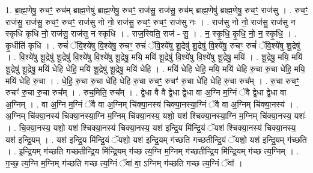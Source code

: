 \documentclass[17pt]{extarticle}
\begin{document}
1. ब्रा॒ह्म॒णेषु॒ रुचꣳ॒॒ रुच॑म् ब्राह्म॒णेषु॑ ब्राह्म॒णेषु॒ रुचꣳ॒॒ राज॑सु॒ राज॑सु॒ रुच॑म् ब्राह्म॒णेषु॑ ब्राह्म॒णेषु॒ रुचꣳ॒॒ राज॑सु । . रुचꣳ॒॒ राज॑सु॒ राज॑सु॒ रुचꣳ॒॒ रुचꣳ॒॒ राज॑सु नो नो॒ राज॑सु॒ रुचꣳ॒॒ रुचꣳ॒॒ राज॑सु नः । . राज॑सु नो नो॒ राज॑सु॒ राज॑सु न स्कृधि कृधि नो॒ राज॑सु॒ राज॑सु न स्कृधि । . राज॒स्विति॒ राज॑ - सु॒ । . न॒ स्कृ॒धि॒ कृ॒धि॒ नो॒ न॒ स्कृ॒धि॒ । . कृ॒धीति॑ कृधि । . रुचं॑ ॅवि॒श्ये॑षु वि॒श्ये॑षु॒ रुचꣳ॒॒ रुचं॑ ॅवि॒श्ये॑षु शू॒द्रेषु॑ शू॒द्रेषु॑ वि॒श्ये॑षु॒ रुचꣳ॒॒ रुचं॑ ॅवि॒श्ये॑षु शू॒द्रेषु॑ । . वि॒श्ये॑षु शू॒द्रेषु॑ शू॒द्रेषु॑ वि॒श्ये॑षु वि॒श्ये॑षु शू॒द्रेषु॒ मयि॒ मयि॑ शू॒द्रेषु॑ वि॒श्ये॑षु वि॒श्ये॑षु शू॒द्रेषु॒ मयि॑ । . शू॒द्रेषु॒ मयि॒ मयि॑ शू॒द्रेषु॑ शू॒द्रेषु॒ मयि॑ धेहि धेहि॒ मयि॑ शू॒द्रेषु॑ शू॒द्रेषु॒ मयि॑ धेहि । . मयि॑ धेहि धेहि॒ मयि॒ मयि॑ धेहि रु॒चा रु॒चा धे॑हि॒ मयि॒ मयि॑ धेहि रु॒चा । . धे॒हि॒ रु॒चा रु॒चा धे॑हि धेहि रु॒चा रुचꣳ॒॒ रुचꣳ॑ रु॒चा धे॑हि धेहि रु॒चा रुच᳚म् । . रु॒चा रुचꣳ॒॒ रुचꣳ॑ रु॒चा रु॒चा रुच᳚म् । . रुच॒मिति॒ रुच᳚म् । . द्वे॒धा वै वै द्वे॒धा द्वे॒धा वा अ॒ग्नि म॒ग्निं ॅवै द्वे॒धा द्वे॒धा वा अ॒ग्निम् । . वा अ॒ग्नि म॒ग्निं ॅवै वा अ॒ग्निम् चि॑क्या॒नस्य॑ चिक्या॒नस्या॒ग्निं ॅवै वा अ॒ग्निम् चि॑क्या॒नस्य॑ । . अ॒ग्निम् चि॑क्या॒नस्य॑ चिक्या॒नस्या॒ग्नि म॒ग्निम् चि॑क्या॒नस्य॒ यशो॒ यश॑ श्चिक्या॒नस्या॒ग्नि म॒ग्निम् चि॑क्या॒नस्य॒ यशः॑ । . चि॒क्या॒नस्य॒ यशो॒ यश॑ श्चिक्या॒नस्य॑ चिक्या॒नस्य॒ यश॑ इन्द्रि॒य मि॑न्द्रि॒यं ॅयश॑ श्चिक्या॒नस्य॑ चिक्या॒नस्य॒ यश॑ इन्द्रि॒यम् । . यश॑ इन्द्रि॒य मि॑न्द्रि॒यं ॅयशो॒ यश॑ इन्द्रि॒यम् ग॑च्छति गच्छतीन्द्रि॒यं ॅयशो॒ यश॑ इन्द्रि॒यम् ग॑च्छति । . इ॒न्द्रि॒यम् ग॑च्छति गच्छतीन्द्रि॒य मि॑न्द्रि॒यम् ग॑च्छ त्य॒ग्नि म॒ग्निम् ग॑च्छतीन्द्रि॒य मि॑न्द्रि॒यम् ग॑च्छ त्य॒ग्निम् । . ग॒च्छ॒ त्य॒ग्नि म॒ग्निम् ग॑च्छति गच्छ त्य॒ग्निं ॅवा॑ वा॒ ऽग्निम् ग॑च्छति गच्छ त्य॒ग्निं ॅवा᳚ । \newline
\end{document}
